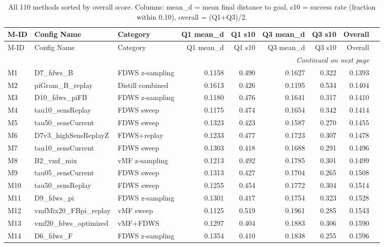 \documentclass[11pt,a4paper]{article}
\begin{document}
\begin{small}
\begin{longtable}{llp{3cm}rrrrrr}
\caption{All 110 methods sorted by overall score. Columns: mean\_d = mean final distance to goal, s10 = success rate (fraction within 0.10), overall = (Q1+Q3)/2.}
\label{tab:all_methods} \\
\toprule
M-ID & Config Name & Category & Q1 mean\_d & Q1 s10 & Q3 mean\_d & Q3 s10 & Overall \\
\midrule
\endfirsthead
\toprule
M-ID & Config Name & Category & Q1 mean\_d & Q1 s10 & Q3 mean\_d & Q3 s10 & Overall \\
\midrule
\endhead
\midrule
\multicolumn{8}{r}{\textit{Continued on next page}} \\
\bottomrule
\endfoot
\bottomrule
\endlastfoot
    M1 & D7\_fdws\_B & FDWS z-sampling & 0.1158 & 0.490 & 0.1627 & 0.322 & 0.1393 \\
    M2 & piGram\_B\_replay & Distill combined & 0.1613 & 0.426 & 0.1195 & 0.534 & 0.1404 \\
    M3 & D10\_fdws\_piFB & FDWS z-sampling & 0.1180 & 0.476 & 0.1641 & 0.317 & 0.1410 \\
    M4 & tau10\_sensReplay & FDWS sweep & 0.1175 & 0.474 & 0.1654 & 0.342 & 0.1414 \\
    M5 & tau50\_sensCurrent & FDWS sweep & 0.1323 & 0.423 & 0.1587 & 0.270 & 0.1455 \\
    M6 & D7v3\_highSensReplayZ & FDWS+replay & 0.1233 & 0.477 & 0.1723 & 0.307 & 0.1478 \\
    M7 & tau10\_sensCurrent & FDWS sweep & 0.1303 & 0.418 & 0.1688 & 0.291 & 0.1496 \\
    M8 & B2\_vmf\_mix & vMF z-sampling & 0.1213 & 0.492 & 0.1785 & 0.301 & 0.1499 \\
    M9 & tau05\_sensCurrent & FDWS sweep & 0.1313 & 0.427 & 0.1704 & 0.265 & 0.1508 \\
    M10 & tau50\_sensReplay & FDWS sweep & 0.1255 & 0.454 & 0.1772 & 0.304 & 0.1514 \\
    M11 & D9\_fdws\_pi & FDWS z-sampling & 0.1301 & 0.417 & 0.1754 & 0.323 & 0.1528 \\
    M12 & vmfMix20\_FBpi\_replay & vMF sweep & 0.1125 & 0.519 & 0.1961 & 0.285 & 0.1543 \\
    M13 & vmf20\_fdws\_optimized & vMF+FDWS & 0.1297 & 0.404 & 0.1883 & 0.306 & 0.1590 \\
    M14 & D6\_fdws\_F & FDWS z-sampling & 0.1354 & 0.410 & 0.1838 & 0.255 & 0.1596 \\

\end{longtable}
\end{small}
\end{document}
